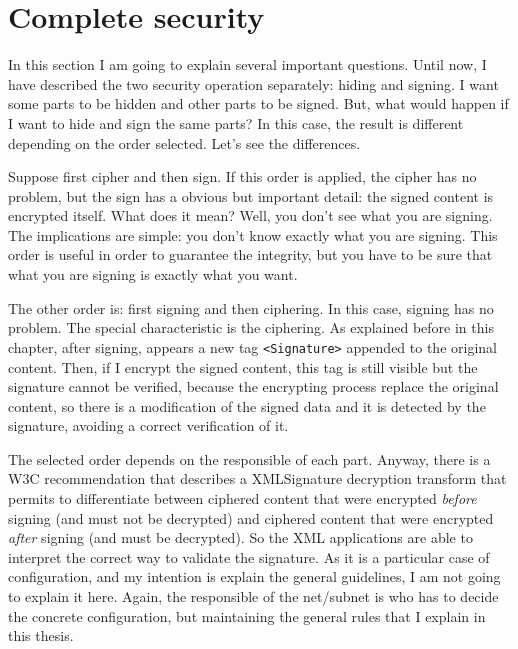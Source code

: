 \section{Complete security}

In this section I am going to explain several important questions.
Until now, I have described the two security operation separately: hiding
and signing. I want some parts to be hidden and other parts to be signed.
But, what would happen if I want to hide and sign the same parts?
In this case, the result is different depending on the order selected. Let's
see the differences.

Suppose first cipher and then sign. If this order is applied, the cipher has no problem, but the sign has a obvious but important detail: the signed content is
encrypted itself. What does it mean? Well, you don't see what you are signing. The implications are simple: you don't know exactly what you are signing. This order is useful in order to guarantee the integrity, but you have to be sure that what you are signing is exactly what you want.

The other order is: first signing and then ciphering. In this case, signing
has no problem. The special characteristic is the ciphering. As explained
before in this chapter, after signing, appears a new tag \texttt{<Signature>}
appended to the original content. Then, if I encrypt the signed content,
this tag is still visible but the signature cannot be verified, because the
encrypting process replace the original content, so there is a modification
of the signed data and it is detected by the signature, avoiding a correct
verification of it.

The selected order depends on the responsible of each part. Anyway, there
is a W3C recommendation that describes a XMLSignature decryption transform \cite{XMLSIG-w3.org/xmlenc-decrypt} that permits to differentiate between ciphered content that were encrypted \emph{before} signing (and must not be decrypted) and ciphered content that were encrypted \emph{after} signing (and must be decrypted). So the XML applications are able to interpret the correct
way to validate the signature. As it is a particular case of configuration, and my intention is explain the general guidelines, I am not going to explain it here. Again, the responsible of the net/subnet is who has to decide the concrete configuration, but maintaining the general rules that I explain in this thesis.

